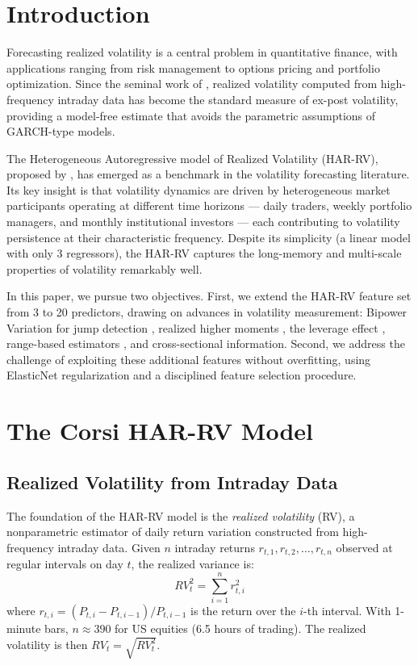 \documentclass[11pt,a4paper]{article}
\begin{document}
\section{Introduction}
\label{sec:intro}

Forecasting realized volatility is a central problem in quantitative finance, with applications ranging from risk management to options pricing and portfolio optimization. Since the seminal work of \citet{andersen2003}, realized volatility computed from high-frequency intraday data has become the standard measure of ex-post volatility, providing a model-free estimate that avoids the parametric assumptions of GARCH-type models.

The Heterogeneous Autoregressive model of Realized Volatility (HAR-RV), proposed by \citet{corsi2009}, has emerged as a benchmark in the volatility forecasting literature. Its key insight is that volatility dynamics are driven by heterogeneous market participants operating at different time horizons --- daily traders, weekly portfolio managers, and monthly institutional investors --- each contributing to volatility persistence at their characteristic frequency. Despite its simplicity (a linear model with only 3 regressors), the HAR-RV captures the long-memory and multi-scale properties of volatility remarkably well.

In this paper, we pursue two objectives. First, we extend the HAR-RV feature set from 3 to 20 predictors, drawing on advances in volatility measurement: Bipower Variation for jump detection \citep{barndorff2004}, realized higher moments \citep{amaya2015}, the leverage effect \citep{black1976}, range-based estimators \citep{parkinson1980}, and cross-sectional information. Second, we address the challenge of exploiting these additional features without overfitting, using ElasticNet regularization \citep{zou2005} and a disciplined feature selection procedure.

\section{The Corsi HAR-RV Model}
\label{sec:corsi}

\subsection{Realized Volatility from Intraday Data}

The foundation of the HAR-RV model is the \textit{realized volatility} (RV), a nonparametric estimator of daily return variation constructed from high-frequency intraday data. Given $n$ intraday returns $r_{t,1}, r_{t,2}, \ldots, r_{t,n}$ observed at regular intervals on day $t$, the realized variance is:
\begin{equation}
    RV_t^2 = \sum_{i=1}^{n} r_{t,i}^2
\end{equation}
where $r_{t,i} = (P_{t,i} - P_{t,i-1}) / P_{t,i-1}$ is the return over the $i$-th interval. With 1-minute bars, $n \approx 390$ for US equities (6.5 hours of trading). The realized volatility is then $RV_t = \sqrt{RV_t^2}$.
\end{document}
